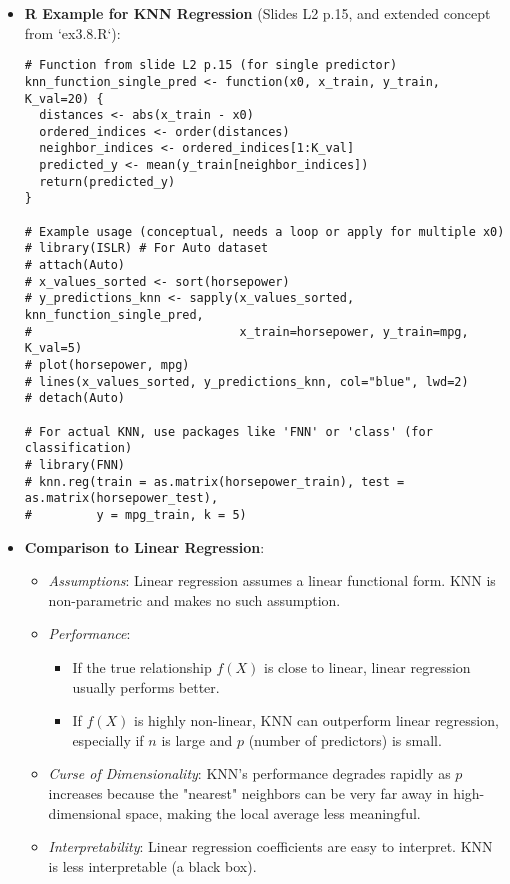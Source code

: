 \documentclass[12pt,a4paper]{article}
\begin{document}
\begin{itemize}
\begin{itemize}
\begin{itemize}
                \end{itemize}
            \item \textbf{R Example for KNN Regression} (Slides L2 p.15, and extended concept from `ex3.8.R`):
\begin{lstlisting}[caption={Conceptual KNN Regression in R}]
# Function from slide L2 p.15 (for single predictor)
knn_function_single_pred <- function(x0, x_train, y_train, K_val=20) {
  distances <- abs(x_train - x0)
  ordered_indices <- order(distances)
  neighbor_indices <- ordered_indices[1:K_val]
  predicted_y <- mean(y_train[neighbor_indices])
  return(predicted_y)
}

# Example usage (conceptual, needs a loop or apply for multiple x0)
# library(ISLR) # For Auto dataset
# attach(Auto)
# x_values_sorted <- sort(horsepower)
# y_predictions_knn <- sapply(x_values_sorted, knn_function_single_pred, 
#                             x_train=horsepower, y_train=mpg, K_val=5)
# plot(horsepower, mpg)
# lines(x_values_sorted, y_predictions_knn, col="blue", lwd=2)
# detach(Auto)

# For actual KNN, use packages like 'FNN' or 'class' (for classification)
# library(FNN)
# knn.reg(train = as.matrix(horsepower_train), test = as.matrix(horsepower_test), 
#         y = mpg_train, k = 5)
\end{lstlisting}
            \item \textbf{Comparison to Linear Regression}:
                \begin{itemize}
                    \item \textit{Assumptions}: Linear regression assumes a linear functional form. KNN is non-parametric and makes no such assumption.
                    \item \textit{Performance}:
                        \begin{itemize}
                            \item If the true relationship $f(X)$ is close to linear, linear regression usually performs better.
                            \item If $f(X)$ is highly non-linear, KNN can outperform linear regression, especially if $n$ is large and $p$ (number of predictors) is small.
                        \end{itemize}
                    \item \textit{Curse of Dimensionality}: KNN's performance degrades rapidly as $p$ increases because the "nearest" neighbors can be very far away in high-dimensional space, making the local average less meaningful.
                    \item \textit{Interpretability}: Linear regression coefficients are easy to interpret. KNN is less interpretable (a black box).
                \end{itemize}
        \end{itemize}

\end{itemize}
\end{document}
